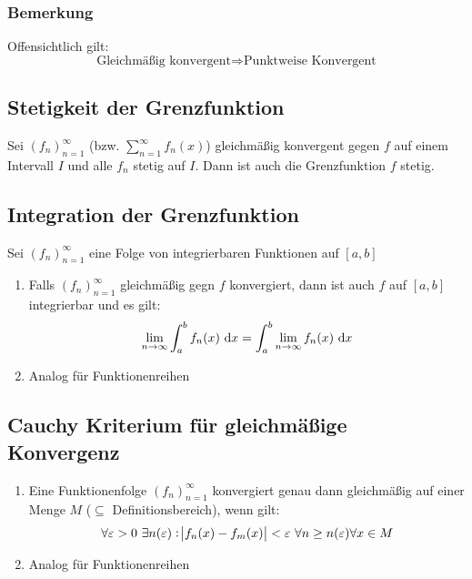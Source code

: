 \subsubsection{Bemerkung}
Offensichtlich gilt:
\begin{equation*}
    \text{Gleichmäßig konvergent} \Rightarrow \text{Punktweise Konvergent}
\end{equation*}


\subsection{Stetigkeit der Grenzfunktion}
Sei ${(f_n)}_{n=1}^\infty$ (bzw. $\sum_{n=1}^\infty f_n(x)$) gleichmäßig konvergent gegen
$f$ auf einem Intervall $I$ und alle $f_n$ stetig auf $I$. Dann ist auch die
Grenzfunktion $f$ stetig.

\subsection{Integration der Grenzfunktion}
Sei ${(f_n)}_{n=1}^\infty$ eine Folge von integrierbaren Funktionen auf $[a,b]$
\begin{enumerate}[label= (\alph*)]
    \item Falls ${(f_n)}_{n=1}^\infty$ gleichmäßig gegn $f$ konvergiert, dann ist
    auch $f$ auf $[a,b]$ integrierbar und es gilt:
        \begin{equation*}
            \lim_{n \rightarrow \infty} \int_a^b f_n(x) \text{ d}x =
            \int_a^b \lim_{n \rightarrow \infty} f_n(x) \text{ d}x
        \end{equation*}
    \item Analog für Funktionenreihen
\end{enumerate}

\subsection{Cauchy Kriterium für gleichmäßige Konvergenz}
\begin{enumerate}[label= (\alph*)]
    \item Eine Funktionenfolge ${(f_n)}_{n=1}^\infty$ konvergiert genau dann
        gleichmäßig auf einer Menge $M$ ($\subseteq$ Definitionsbereich), wenn
        gilt:
        \begin{equation*}
            \forall \varepsilon > 0\ \exists n(\varepsilon):
            \abs{f_n(x) - f_m(x)} < \varepsilon\ \forall n \geq n(\varepsilon) \forall x \in M
        \end{equation*}
    \item Analog für Funktionenreihen
\end{enumerate}


